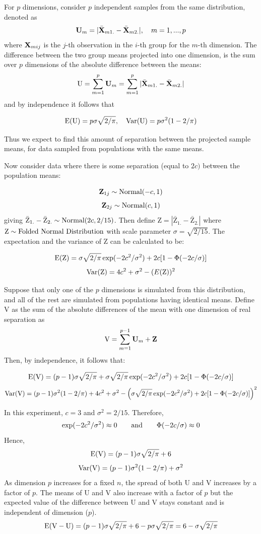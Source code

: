 For $p$ dimensions, consider $p$ independent samples from the same distribution,  denoted as $${\mbox{\boldmath {\bf U}}}_m = |\bar{{\mbox{\boldmath {\bf X}}}}_{m1.} - \bar{{\mbox{\boldmath {\bf X}}}}_{m2.}|, ~~~ m=1, ..., p$$ where ${\mbox{\boldmath {\bf X}}} _{mij}$ is the $j$-th observation in the $i$-th group for the $m$-th dimension. The difference between the two group means projected into one dimension, is the sum over $p$ dimensions of the absolute difference between the means: $$\mbox{U}  = \sum_{m=1}^p {\mbox{\boldmath {\bf U}}}_m = \sum_{m=1}^p |\bar{{\mbox{\boldmath {\bf X}}}}_{m1.} - \bar{{\mbox{\boldmath {\bf X}}}}_{m2.}| $$ and by independence it follows that

$$\hbox{E}(\mbox{U}) = p \sigma \sqrt{2/\pi}, ~~~ 
\hbox{Var}(\mbox{U}) = p \sigma^2 (1 - 2/\pi)$$

\noindent Thus we expect to find this amount of separation between the projected sample means, for data sampled from populations with the same means.

Now consider data where there is some separation (equal to $2c)$ between the population means:

$${\mbox{\boldmath {\bf Z}}}_{1j} \sim \hbox{Normal}(-c, 1) $$
$${\mbox{\boldmath {\bf Z}}}_{2j} \sim \hbox{Normal}(c, 1) $$ 
giving $\bar{\mbox{Z}}_{1.} - \bar{\mbox{Z}}_{2.} \sim \hbox{Normal}(2c, 2/15)$. Then define $\mbox{Z}  = |\bar{\mbox{Z}}_{1.} - \bar{\mbox{Z}}_{2.}|$ where ${\mbox{Z}} \sim \hbox{Folded Normal Distribution}$ with scale parameter $ \sigma = \sqrt{2/15}$.  The expectation and the variance of $\mbox{Z}$ can be calculated to be:

$$\hbox{E}(\mbox{Z}) = \sigma \sqrt{2/\pi} \exp(- 2c^2/\sigma^2) + 2c[1 - \Phi(-2c/\sigma)]$$
$$\hbox{Var}(\mbox{Z}) = 4c^2 + \sigma^2 - (E(\mbox{Z}))^2$$

Suppose that only one of the $p$ dimensions is simulated from this distribution, and all of the rest are simulated from populations having identical means. Define $\mbox{V}$ as the sum of the absolute differences of the mean with one dimension of real separation as $$\mbox{V} = \sum_{m=1}^{p-1} \mbox{\boldmath {\bf U}}_m + {\mbox{\boldmath {\bf Z}}}$$ Then, by independence, it follows that:

$$\hbox{E}(\mbox{V}) = (p - 1) \sigma \sqrt{2/\pi} + \sigma \sqrt{2/\pi} \exp(- 2c^2/\sigma^2) + 2c[1 - \Phi(-2c/\sigma)]$$
$$\hbox{Var}(\mbox{V}) = (p - 1)\sigma^2 (1 - 2/\pi) + 4c^2 + \sigma^2 - \left( \sigma \sqrt{2/\pi} \exp(- 2c^2/\sigma^2) + 2c[1 - \Phi(-2c/\sigma)]\right)^2$$

In this experiment, $c = 3$ and $\sigma^2 = 2/15$. Therefore,
$$\exp(- 2c^2/\sigma^2) \approx 0 \qquad \hbox{and} \qquad \Phi(-2c/\sigma) \approx 0$$
Hence,
$$\hbox{E}(\mbox{V}) = (p - 1) \sigma \sqrt{2/\pi} + 6$$
$$\hbox{Var}(\mbox{V}) = (p - 1)\sigma^2 (1 - 2/\pi) + \sigma^2$$
As dimension $p$ increases for a fixed $n$, the spread of both U and V increases by a factor of $p$. The means of U and V also increase with a factor of $p$ but the expected value of the difference between U and V stays constant and is independent of dimension ($p$). 
$$\hbox{E} (\mbox{V} - \mbox{U}) = (p - 1) \sigma \sqrt{2/\pi} + 6 - p \sigma \sqrt{2/\pi} = 6 - \sigma \sqrt{2/\pi}$$


